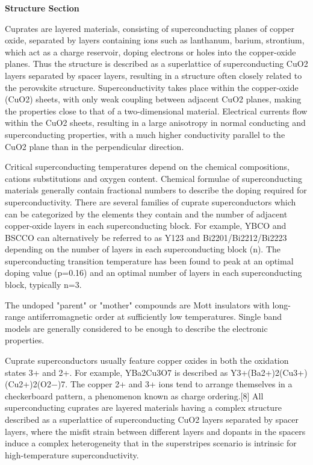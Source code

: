 \documentclass[a4paper,11pt]{article}
\begin{document}
\textbf{Structure Section}

Cuprates are layered materials, consisting of superconducting planes of copper oxide, separated by layers containing ions such as lanthanum, barium, strontium, which act as a charge reservoir, doping electrons or holes into the copper-oxide planes. Thus the structure is described as a superlattice of superconducting CuO2 layers separated by spacer layers, resulting in a structure often closely related to the perovskite structure. Superconductivity takes place within the copper-oxide (CuO2) sheets, with only weak coupling between adjacent CuO2 planes, making the properties close to that of a two-dimensional material. Electrical currents flow within the CuO2 sheets, resulting in a large anisotropy in normal conducting and superconducting properties, with a much higher conductivity parallel to the CuO2 plane than in the perpendicular direction.

Critical superconducting temperatures depend on the chemical compositions, cations substitutions and oxygen content. Chemical formulae of superconducting materials generally contain fractional numbers to describe the doping required for superconductivity. There are several families of cuprate superconductors which can be categorized by the elements they contain and the number of adjacent copper-oxide layers in each superconducting block. For example, YBCO and BSCCO can alternatively be referred to as Y123 and Bi2201/Bi2212/Bi2223 depending on the number of layers in each superconducting block (n). The superconducting transition temperature has been found to peak at an optimal doping value (p=0.16) and an optimal number of layers in each superconducting block, typically n=3.

The undoped "parent" or "mother" compounds are Mott insulators with long-range antiferromagnetic order at sufficiently low temperatures. Single band models are generally considered to be enough to describe the electronic properties.

Cuprate superconductors usually feature copper oxides in both the oxidation states 3+ and 2+. For example, YBa2Cu3O7 is described as Y3+(Ba2+)2(Cu3+)(Cu2+)2(O2−)7. The copper 2+ and 3+ ions tend to arrange themselves in a checkerboard pattern, a phenomenon known as charge ordering.[8] All superconducting cuprates are layered materials having a complex structure described as a superlattice of superconducting CuO2 layers separated by spacer layers, where the misfit strain between different layers and dopants in the spacers induce a complex heterogeneity that in the superstripes scenario is intrinsic for high-temperature superconductivity.
\end{document}
